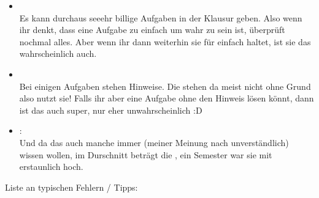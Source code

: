 \documentclass{scrartcl}
\begin{document}
\begin{itemize}
		\item {} \\
		Es kann durchaus seeehr billige Aufgaben in der Klausur geben. Also wenn ihr denkt, dass eine Aufgabe zu einfach um wahr zu sein ist, überprüft nochmal alles. Aber wenn ihr dann weiterhin sie für einfach haltet, ist sie das wahrscheinlich auch.
		
		\item {} \\
		Bei einigen Aufgaben stehen Hinweise. Die stehen da meist nicht ohne Grund also nutzt sie! Falls ihr aber eine Aufgabe ohne den Hinweis lösen könnt, dann ist das auch super, nur eher unwahrscheinlich :D
		
		\item {}: \\
		Und da das auch manche immer (meiner Meinung nach unverständlich) wissen wollen, im Durschnitt beträgt die , ein Semester war sie mit  erstaunlich hoch. 
	\end{itemize}


	\newpage
	
	\Large
	Liste an typischen Fehlern / Tipps:
	\large
	
\end{document}
